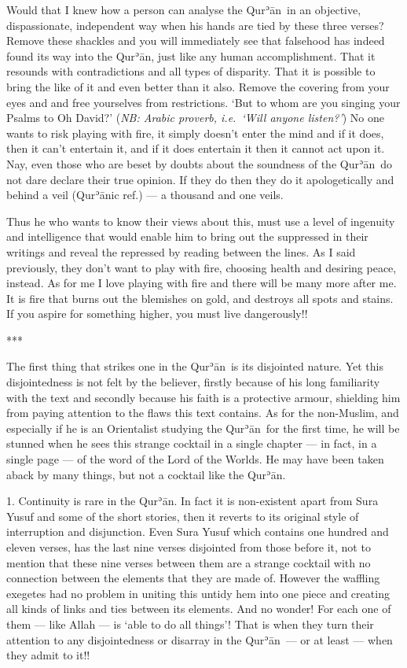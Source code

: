 \documentclass[12pt]{memoir}
\def\´{ʾ} %
\newcommand{\ar}[1]{\RL{\arabicfont#1}}
\def \Quran{Qur\-\´ān} %
\def\pardivider{\centerline{***}} %
\newcommand{\NB}[1]{\emph{\small NB: #1}}
\begin{document}
Would that I knew how a person can analyse the \Quran\ in an objective,
dispassionate, independent way when his hands are tied by these three verses?
Remove these shackles and you will immediately see that falsehood
has indeed found its way into the \Quran,
just like any human accomplishment.
That it resounds with contradictions and all types of disparity.
That it is possible to bring the like of it and even better than it also.
Remove the covering from your eyes and and free yourselves from restrictions.
‘But to whom are you singing your Psalms to Oh David?’
(\NB{Arabic proverb, i.e.\ ‘Will anyone listen?’})
No one wants to risk playing with fire,
it simply doesn’t enter the mind and if it does,
then it can’t entertain it, and if it does entertain it
then it cannot act upon it.
Nay, even those who are beset by doubts about the soundness of the \Quran\
do not dare declare their true opinion.
If they do then they do it apologetically and behind a veil (\Quran{}ic ref.) —
a thousand and one veils.

Thus he who wants to know their views about this,
must use a level of ingenuity and intelligence
that would enable him to bring out the suppressed in their writings
and reveal the repressed by reading between the lines.
As I said previously, they don’t want to play with fire,
choosing health and desiring peace, instead.
As for me I love playing with fire and there will be many more after me.
It is fire that burns out the blemishes on gold,
and destroys all spots and stains.
If you aspire for something higher, you must live dangerously!!

\pardivider

The first thing that strikes one in the \Quran\ is its disjointed nature.
Yet this disjointedness is not felt by the believer,
firstly because of his long familiarity with the text and secondly
because his faith is a protective armour,
shielding him from paying attention to the flaws this text contains.
As for the non-Muslim, and especially if he is an Orientalist
studying the \Quran\ for the first time,
he will be stunned when he sees this strange cocktail in a single chapter —
in fact, in a single page — of the word of the Lord of the Worlds.
He may have been taken aback by many things,
but not a cocktail like the \Quran.

1. Continuity is rare in the \Quran.
In fact it is non-existent apart from Sura Yusuf and some of the short stories,
then it reverts to its original style of interruption and disjunction.
Even Sura Yusuf which contains one hundred and eleven verses,
has the last nine verses disjointed from those before it,
not to mention that these nine verses between them are a strange cocktail
with no connection between the elements that they are made of.
However the waffling exegetes had no problem in uniting this untidy hem
into one piece and creating all kinds of links and ties between its elements.
And no wonder! For each one of them — like Allah — is ‘able to do all things’!
That is when they turn their attention to any disjointedness
or disarray in the \Quran\ — or at least — when they admit to it!!
\end{document}
